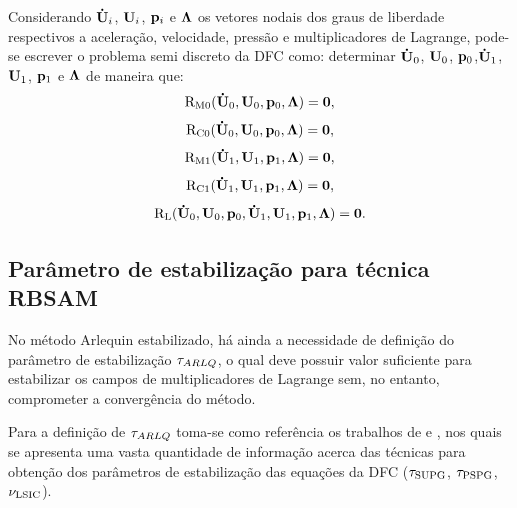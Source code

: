Considerando $\mathbf{\dot{U}}_i$, $\mathbf{U}_i$, $\mathbf{p}_i$ e $\boldsymbol{\Lambda}$ os vetores nodais dos graus de liberdade respectivos a aceleração, velocidade, pressão e multiplicadores de Lagrange, pode-se escrever o problema semi discreto da DFC como: determinar $\mathbf{\dot{U}}_0$, $\mathbf{U}_0$, $\mathbf{p}_0$,$\mathbf{\dot{U}}_1$, $\mathbf{U}_1$, $\mathbf{p}_1$ e $\boldsymbol{\Lambda}$ de maneira que:
\begin{align}
	\mathrm{R}_\mathrm{M0}(\mathbf{\dot{U}}_0,\mathbf{U}_0,\mathbf{p}_0,\boldsymbol{\Lambda}) = \mathbf{0}, \label{eq:resid_semi_discr_QM_0}
\end{align}
\begin{align}
	\mathrm{R}_\mathrm{C0}(\mathbf{\dot{U}}_0,\mathbf{U}_0,\mathbf{p}_0,\boldsymbol{\Lambda}) = \mathbf{0}, 
\end{align}
\begin{align}
	\mathrm{R}_\mathrm{M1}(\mathbf{\dot{U}}_1,\mathbf{U}_1,\mathbf{p}_1,\boldsymbol{\Lambda}) = \mathbf{0},
\end{align}
\begin{align}
	\mathrm{R}_\mathrm{C1}(\mathbf{\dot{U}}_1,\mathbf{U}_1,\mathbf{p}_1,\boldsymbol{\Lambda}) = \mathbf{0},
\end{align}
\begin{align}
	\mathrm{R}_\mathrm{L}(\mathbf{\dot{U}}_0,\mathbf{U}_0,\mathbf{p}_0,\mathbf{\dot{U}}_1,\mathbf{U}_1,\mathbf{p}_1,\boldsymbol{\Lambda}) = \mathbf{0}. \label{eq:resid_semi_discr_acopla}
\end{align}


\subsection{Parâmetro de estabilização para técnica RBSAM}

No método Arlequin estabilizado, há ainda a necessidade de definição do parâmetro de estabilização $\tau_{ARLQ}$, o qual deve possuir valor suficiente para estabilizar os campos de multiplicadores de Lagrange sem, no entanto, comprometer a convergência do método. 

Para a definição de $\tau_{ARLQ}$ toma-se como referência os trabalhos de  e , nos quais se apresenta uma vasta quantidade de informação acerca das técnicas para obtenção dos parâmetros de estabilização das equações da DFC ($\tau_{\mathrm{SUPG}}$, $\tau_{\mathrm{PSPG}}$, $\nu_{\mathrm{LSIC}}$). 

